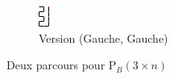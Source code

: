 \documentclass[twoside, a4paper, 12pt]{report}
\newcommand{\pb}[2]{\ensuremath{\text{P}_B\left(#1 \times #2\right)}}
\begin{document}
\begin{figure}[h]
\begin{center}
\begin{subfigure}[b]{0.1\textwidth}
   \includegraphics[width=1\linewidth, scale=1]{3_5_pb_3n_v2.png}
   \caption{Version (Gauche,  Gauche)}
\end{subfigure}
\caption{Deux parcours pour \pb{3}{n}}
\label{pb_3_n}
\end{center}
\end{figure}
\end{document}
